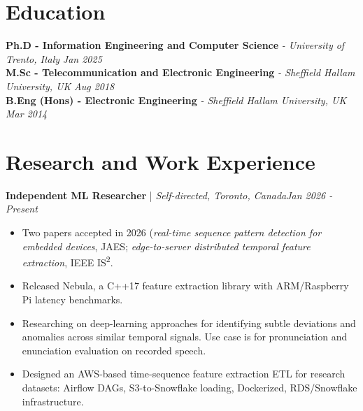 \documentclass[11pt]{article}
\newenvironment{cvrole}[5]{%
  \par\noindent\textbf{\large #1} | \textit{\small #2, #3}\hfill \textit{\small #4 - #5}\par
  \begin{itemize}[leftmargin=2em, itemsep=-0.3em, topsep=-0.5em]%
}{%
  \end{itemize}\par\noindent\mbox{}\par\vspace{0.1em}%
}
\begin{document}
\section*{Education}
\textbf{Ph.D - Information Engineering and Computer Science} \textit{\small{ - University of Trento, Italy}} \hfill \textit{Jan 2025}\\[-1pt]
\noindent\textbf{M.Sc - Telecommunication and Electronic Engineering} \textit{\small{ - Sheffield Hallam University, UK}} \hfill \textit{Aug 2018}\\[3pt]
\noindent\textbf{B.Eng (Hons) - Electronic Engineering} \textit{\small{ - Sheffield Hallam University, UK}} \hfill \textit{Mar 2014}


\newpage
\section*{Research and Work Experience}

\begin{cvrole}{Independent ML Researcher}{Self-directed}{Toronto, Canada}{Jan 2026}{Present}

    \item Two papers accepted in 2026 (\textit{real-time sequence pattern detection for embedded devices}, JAES; \textit{edge-to-server distributed temporal feature extraction}, IEEE IS\textsuperscript{2}.
    \item Released {Nebula}, a C++17 feature extraction library with ARM/Raspberry Pi latency benchmarks.
    \item Researching on deep-learning approaches for identifying subtle deviations and anomalies across similar temporal signals. Use case is for pronunciation and enunciation evaluation on recorded speech.
    \item Designed an AWS-based time-sequence feature extraction ETL for research datasets: Airflow DAGs, S3-to-Snowflake loading, Dockerized, RDS/Snowflake infrastructure.
\end{cvrole}
\end{document}
